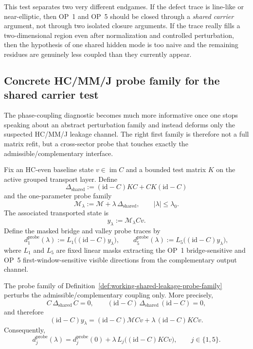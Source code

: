 \begin{remark}
\label{rem:working-last-shared-phase-diagnostic}
This test separates two very different endgames. If the defect trace is line-like or near-elliptic, then OP~1 and OP~5 should be closed through a \emph{shared carrier} argument, not through two isolated closure arguments. If the trace really fills a two-dimensional region even after normalization and controlled perturbation, then the hypothesis of one shared hidden mode is too naive and the remaining residues are genuinely less coupled than they currently appear.
\end{remark}


\subsection*{Concrete HC/MM/J probe family for the shared carrier test}
The phase-coupling diagnostic becomes much more informative once one stops speaking about an abstract perturbation family and instead deforms only the suspected HC/MM/J leakage channel. The right first family is therefore not a full matrix refit, but a cross-sector probe that touches exactly the admissible/complementary interface.

\begin{definition}
\label{def:working-shared-leakage-probe-family}
Fix an HC-even baseline state \(v\in \operatorname{im} C\) and a bounded test matrix \(K\) on the active grouped transport layer. Define
\[
 \Delta_{\mathrm{shared}}:=(\mathrm{id}-C)KC + CK(\mathrm{id}-C)
\]
and the one-parameter probe family
\[
 \mathcal M_\lambda:=\mathcal M+\lambda\,\Delta_{\mathrm{shared}},
 \qquad |
 \lambda|\le \lambda_0.
\]
The associated transported state is
\[
 y_\lambda:=\mathcal M_\lambda C v.
\]
Define the masked bridge and valley probe traces by
\[
 d^{\mathrm{probe}}_1(\lambda):=L_1\bigl((\mathrm{id}-C)y_\lambda\bigr),
 \qquad
 d^{\mathrm{probe}}_5(\lambda):=L_5\bigl((\mathrm{id}-C)y_\lambda\bigr),
\]
where \(L_1\) and \(L_5\) are fixed linear masks extracting the OP~1 bridge-sensitive and OP~5 first-window-sensitive visible directions from the complementary output channel.
\end{definition}

\begin{proposition}
\label{prop:working-first-order-shared-leakage-isolation}
The probe family of Definition~\ref{def:working-shared-leakage-probe-family} perturbs the admissible/complementary coupling only. More precisely,
\[
 C\,\Delta_{\mathrm{shared}}\,C = 0,
 \qquad
 (\mathrm{id}-C)\,\Delta_{\mathrm{shared}}\,(\mathrm{id}-C)=0,
\]
and therefore
\[
 (\mathrm{id}-C)y_\lambda
 = (\mathrm{id}-C)\mathcal M C v + \lambda\,(\mathrm{id}-C)KC v.
\]
Consequently,
\[
 d^{\mathrm{probe}}_j(\lambda)=d^{\mathrm{probe}}_j(0)+\lambda\,L_j\bigl((\mathrm{id}-C)KC v\bigr),
 \qquad j\in\{1,5\}.
\]
\end{proposition}

